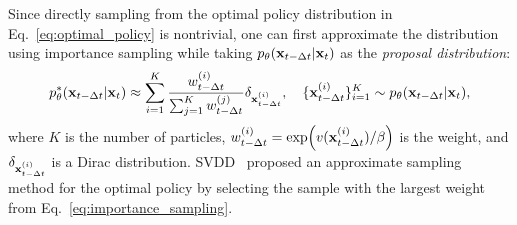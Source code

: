 
Since directly sampling from the optimal policy distribution in Eq.~\ref{eq:optimal_policy} is nontrivial, one can first approximate the distribution using importance sampling while taking $p_{\theta}(\mathbf{x}_{t-\Delta t} | \mathbf{x}_{t})$ as the \emph{proposal distribution}:
{\small
\begin{align}
    \label{eq:importance_sampling}
    p^{*}_\theta(\mathbf{x}_{t-\Delta t} | \mathbf{x}_{t}) \approx \sum_{i=1}^K \frac{w^{(i)}_{t-\Delta t}}{\sum_{j=1}^K w^{(j)}_{t-\Delta t}} \delta_{\mathbf{x}^{(i)}_{t-\Delta t}}, \quad
    \{ \mathbf{x}^{(i)}_{t-\Delta t} \}_{i=1}^{K} \sim p_\theta(\mathbf{x}_{t-\Delta t} | \mathbf{x}_{t}), 
\end{align}
}%
where $K$ is the number of particles, $w^{(i)}_{t-\Delta t} = \exp( v ( \mathbf{x}^{(i)}_{t-\Delta t} ) / \beta )$ is the weight, and $\delta_{\mathbf{x}^{(i)}_{t-\Delta t}}$ is a Dirac distribution. 
SVDD~\cite{Li2024:SVDD} proposed an approximate sampling method for the optimal policy by selecting the sample with the largest weight from Eq.~\ref{eq:importance_sampling}. 

